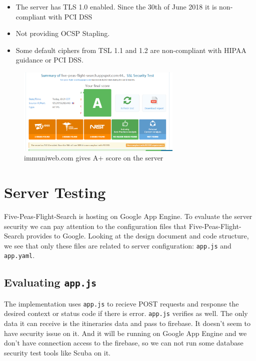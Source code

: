 \documentclass[12pt, a4paper]{article}
\newcommand{\code}[1]{\texttt{#1}}
\begin{document}
\begin{itemize}
    \item The server has TLS 1.0 enabled. Since the 30th of June 2018 it is non-compliant with PCI DSS
    \item Not providing OCSP Stapling.
    \item Some default ciphers from TSL 1.1 and 1.2 are non-compliant with HIPAA guidance or PCI DSS.
\end{itemize}



\begin{figure}[ht]
\centering
\includegraphics[width=0.7\textwidth]{immuniweb.png}
\caption{immuniweb.com gives A+ score on the server}
\label{fig:immuniweb}
\end{figure}

\section{Server Testing}
Five-Peas-Flight-Search is hosting on Google App Engine. To evaluate the server security we can pay attention to the configuration files that Five-Peas-Flight-Search provides to Google. Looking at the design document and code structure, we see that only these files are related to server configuration: \code{app.js} and \code{app.yaml}.

\subsection{Evaluating \code{app.js}}
The implementation uses \code{app.js} to recieve POST requests and response the desired context or status code if there is error. \code{app.js} verifies as well. The only data it can receive is the itineraries data and pass to firebase. It doesn't seem to have security issue on it. And it will be running on Google App Engine and we don't have connection access to the firebase, so we can not run some database security test tools like Scuba on it.
\end{document}
